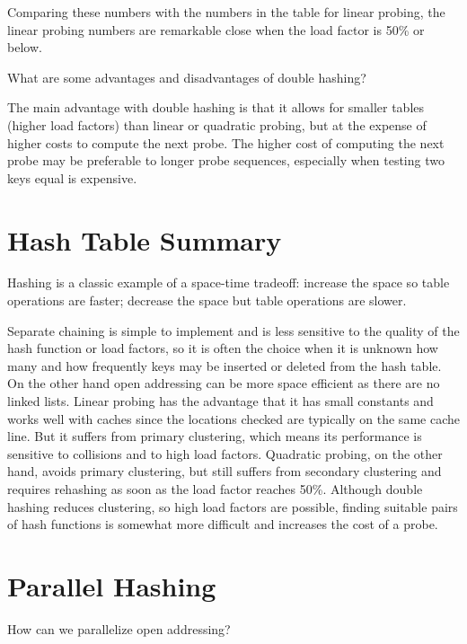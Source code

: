 Comparing these numbers with the numbers in the table for linear
probing, the linear probing numbers are remarkable close when the load
factor is 50\% or below.

\begin{question}
What are some advantages and disadvantages of double hashing?
\end{question}

The main advantage with double hashing is that it allows for smaller
tables (higher load factors) than linear or quadratic probing, but at
the expense of higher costs to compute the next probe.  The higher
cost of computing the next probe may be preferable to longer probe
sequences, especially when testing two keys equal is expensive.

\section{Hash Table Summary}

Hashing is a classic example of a space-time tradeoff: increase the
space so table operations are faster; decrease the space but table
operations are slower.

Separate chaining is simple to implement and is less sensitive to the
quality of the hash function or load factors, so it is often the
choice when it is unknown how many and how frequently keys may be
inserted or deleted from the hash table.  On the other hand open
addressing can be more space efficient as there are no linked lists.
Linear probing has the advantage that it has small constants and works
well with caches since the locations checked are typically on the same
cache line. But it suffers from primary clustering, which means its
performance is sensitive to collisions and to high load factors.
Quadratic probing, on the other hand, avoids primary clustering, but
still suffers from secondary clustering and requires rehashing as soon
as the load factor reaches 50\%. Although double hashing reduces
clustering, so high load factors are possible, finding suitable pairs
of hash functions is somewhat more difficult and increases the cost of
a probe.

\section{Parallel Hashing}

\begin{question}
How can we parallelize open addressing?
\end{question}

